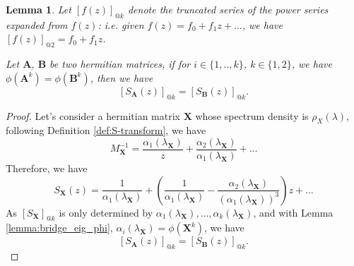 \documentclass[10pt,journal,compsoc]{IEEEtran}
\newtheorem{lemma}[theorem]{Lemma}
\begin{document}
\begin{lemma}
Let $[f(z)]_{@k}$ denote the truncated series of the power series expanded from $f(z)$: i.e. given $f(z) = f_0 + f_1z+...$, we have $[f(z)]_{@2} = f_0 + f_1z$. 

Let $\mathbf{A}$, $\mathbf{B}$ be two hermitian matrices, if for $i\in\{1,..,k\}$, $k\in\{1,2\}$, we have $\phi(\mathbf{A}^k) = \phi(\mathbf{B}^k)$, then we have
\begin{equation}
    \left[S_{\mathbf{A}}(z)\right]_{@k} =  \left[S_{\mathbf{B}}(z)\right]_{@k}.
\end{equation}
\label{lemma:equivalent_S_transform}
\end{lemma}
\begin{proof}
Let's consider a hermitian matrix $\mathbf{X}$ whose spectrum density is $\rho_{X}(\lambda)$, following Definition \ref{def:S-transform}, we have
\begin{equation}
    M_{\mathbf{X}}^{-1} = \frac{\alpha_1(\lambda_{\mathbf{X}})}{z} + \frac{\alpha_2(\lambda_{\mathbf{X}})}{\alpha_1(\lambda_{\mathbf{X}})} + ...
\end{equation}
Therefore, we have
\begin{equation}
    S_{\mathbf{X}}(z) = \frac{1}{\alpha_1(\lambda_{\mathbf{X}})} + \left(\frac{1}{\alpha_1(\lambda_{\mathbf{X}})} - \frac{\alpha_2(\lambda_{\mathbf{X}})}{\left(\alpha_1(\lambda_{\mathbf{X}})\right)^3}\right)z + ...
\label{equ:expand_S}
\end{equation}
As $[S_{\mathbf{X}}]_{@k}$ is only determined by $\alpha_1(\lambda_{\mathbf{X}}),...,\alpha_k(\lambda_{\mathbf{X}})$, and with Lemma \ref{lemma:bridge_eig_phi}, $\alpha_i(\lambda_{\mathbf{X}})=\phi(\mathbf{X}^k)$, we have
\begin{equation}
    \left[S_{\mathbf{A}}(z)\right]_{@k} =  \left[S_{\mathbf{B}}(z)\right]_{@k}.
\end{equation}
\end{proof}
\end{document}
